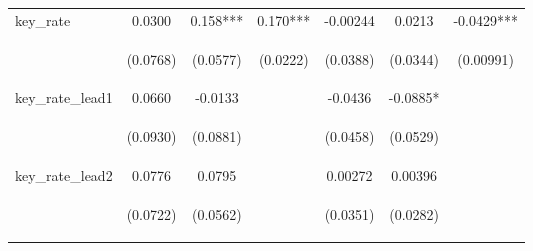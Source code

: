 \documentclass[]{article}
\begin{document}
\begin{center}
\begin{tabular}{lcccccc}
key\_rate & 0.0300 & 0.158*** & 0.170*** & -0.00244 & 0.0213 & -0.0429*** \\
\vspace{4pt} & \begin{footnotesize}(0.0768)\end{footnotesize} & \begin{footnotesize}(0.0577)\end{footnotesize} & \begin{footnotesize}(0.0222)\end{footnotesize} & \begin{footnotesize}(0.0388)\end{footnotesize} & \begin{footnotesize}(0.0344)\end{footnotesize} & \begin{footnotesize}(0.00991)\end{footnotesize} \\
key\_rate\_lead1 & 0.0660 & -0.0133 &  & -0.0436 & -0.0885* &  \\
\vspace{4pt} & \begin{footnotesize}(0.0930)\end{footnotesize} & \begin{footnotesize}(0.0881)\end{footnotesize} & \begin{footnotesize}\end{footnotesize} & \begin{footnotesize}(0.0458)\end{footnotesize} & \begin{footnotesize}(0.0529)\end{footnotesize} & \begin{footnotesize}\end{footnotesize} \\
key\_rate\_lead2 & 0.0776 & 0.0795 &  & 0.00272 & 0.00396 &  \\
\vspace{4pt} & \begin{footnotesize}(0.0722)\end{footnotesize} & \begin{footnotesize}(0.0562)\end{footnotesize} & \begin{footnotesize}\end{footnotesize} & \begin{footnotesize}(0.0351)\end{footnotesize} & \begin{footnotesize}(0.0282)\end{footnotesize} & \begin{footnotesize}\end{footnotesize} \\

\end{tabular}
\end{center}
\end{document}
